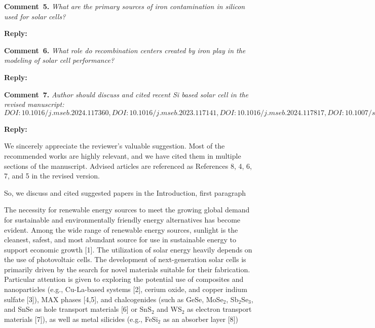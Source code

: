 \documentclass[a4paper,fleqn]{cas-sc}
\begin{document}
%

\vspace{1cm}
\noindent
\textcolor[rgb]{0.00,0.50,1.00}{\textbf{Comment~5.}}
\emph{What are the primary sources of iron contamination in silicon used for solar cells?}


\noindent
\textcolor[rgb]{0.51,0.00,0.00}{\textbf{Reply:}}



\vspace{1cm}
\noindent
\textcolor[rgb]{0.00,0.50,1.00}{\textbf{Comment~6.}}
\emph{What role do recombination centers created by iron play in the modeling of solar cell performance?}


\noindent
\textcolor[rgb]{0.51,0.00,0.00}{\textbf{Reply:}}



\vspace{1cm}
\noindent
\textcolor[rgb]{0.00,0.50,1.00}{\textbf{Comment~7.}}
\emph{Author should discuss and cited recent Si based solar cell in the revised manuscript:
$DOI:10.1016/j.mseb.2024.117360,
DOI:10.1016/j.mseb.2023.117141,
DOI:10.1016/j.mseb.2024.117817,
DOI:10.1007/s42247-024-00821-y,
DOI:10.1016/j.inoche.2024.112785$}

\noindent
\textcolor[rgb]{0.51,0.00,0.00}{\textbf{Reply:}}


We sincerely appreciate the reviewer’s valuable suggestion.
Most of the recommended works are highly relevant, and we have cited them in multiple sections of the manuscript.
Advised articles are referenced as References 8, 4, 6, 7, and 5 in the revised version.

So, we discuss and cited suggested papers in the Introduction, first paragraph

\begin{mdframed}
The necessity for renewable energy sources to meet the growing global demand for sustainable and environmentally friendly energy alternatives has become evident.
Among the wide range of renewable energy sources, sunlight is the cleanest, safest,
and most abundant source for use in sustainable energy to support economic growth [1].
The utilization of solar energy heavily depends on the use of photovoltaic cells.
\textcolor[rgb]{1.00,0.07,0.00}{
The development of next-generation solar cells is primarily driven by the search for novel materials suitable for their fabrication.
Particular attention is given to exploring the potential use of composites and nanoparticles
(e.g., Cu-La-based systems [2], cerium oxide, and copper indium sulfate [3]),
MAX phases [4,5],
and chalcogenides (such as GeSe, MoSe$_2$, Sb$_2$Se$_3$, and SnSe as hole transport materials [6]
or SnS$_2$ and WS$_2$ as electron transport materials [7]),
as well as metal silicides (e.g., FeSi$_2$ as an absorber layer [8])}
\end{mdframed}
\end{document}
